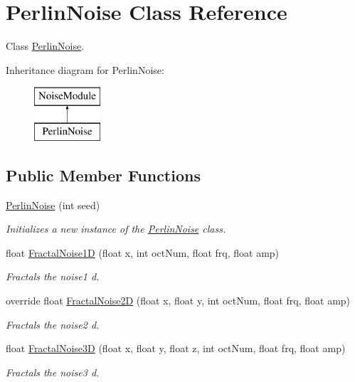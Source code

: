\hypertarget{class_perlin_noise}{}\section{Perlin\+Noise Class Reference}
\label{class_perlin_noise}


Class \hyperlink{class_perlin_noise}{Perlin\+Noise}.  


Inheritance diagram for Perlin\+Noise\+:\begin{figure}[H]
\begin{center}
\leavevmode
\includegraphics[height=2.000000cm]{class_perlin_noise}
\end{center}
\end{figure}
\subsection*{Public Member Functions}
\begin{DoxyCompactItemize}
\item 
\hyperlink{class_perlin_noise_ac14b2a75496fa726a113b01c52b81279}{Perlin\+Noise} (int seed)
\begin{DoxyCompactList}\small\item\em Initializes a new instance of the \hyperlink{class_perlin_noise}{Perlin\+Noise} class. \end{DoxyCompactList}\item 
float \hyperlink{class_perlin_noise_afd838a3594e55a953557fbecae3c3c09}{Fractal\+Noise1D} (float x, int oct\+Num, float frq, float amp)
\begin{DoxyCompactList}\small\item\em Fractals the noise1 d. \end{DoxyCompactList}\item 
override float \hyperlink{class_perlin_noise_a5006a6d875ca81f46c597a8846fa7fd8}{Fractal\+Noise2D} (float x, float y, int oct\+Num, float frq, float amp)
\begin{DoxyCompactList}\small\item\em Fractals the noise2 d. \end{DoxyCompactList}\item 
float \hyperlink{class_perlin_noise_a9aac3d4201b63e1b28fe62c4b76e51dd}{Fractal\+Noise3D} (float x, float y, float z, int oct\+Num, float frq, float amp)
\begin{DoxyCompactList}\small\item\em Fractals the noise3 d. \end{DoxyCompactList}\end{DoxyCompactItemize}
